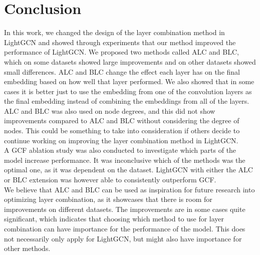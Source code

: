 \section{Conclusion}
In this work, we changed the design of the layer combination method in LightGCN and showed through experiments that our method improved the performance of LightGCN.
We proposed two methods called ALC and BLC, which on some datasets showed large improvements and on other datasets showed small differences.
ALC and BLC change the effect each layer has on the final embedding based on how well that layer performed.
We also showed that in some cases it is better just to use the embedding from one of the convolution layers as the final embedding instead of combining the embeddings from all of the layers.
ALC and BLC was also used on node degrees, and this did not show improvements compared to ALC and BLC without considering the degree of nodes.
This could be something to take into consideration if others decide to continue working on improving the layer combination method in LightGCN.\\
A GCF ablation study was also conducted to investigate which parts of the model increase performance.
It was inconclusive which of the methods was the optimal one, as it was dependent on the dataset.
LightGCN with either the ALC or BLC extension was however able to consistently outperform GCF.\\
We believe that ALC and BLC can be used as inspiration for future research into optimizing layer combination, as it showcases that there is room for improvements on different datasets.
The improvements are in some cases quite significant, which indicates that choosing which method to use for layer combination can have importance for the performance of the model.
This does not necessarily only apply for LightGCN, but might also have importance for other methods. 
